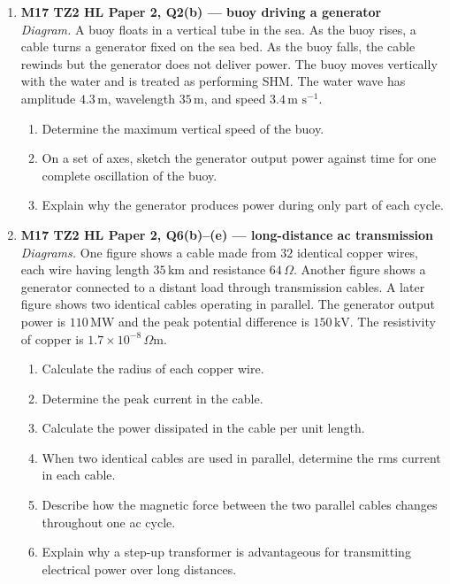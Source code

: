 \documentclass[11pt]{article}
\begin{document}
\begin{enumerate}[leftmargin=*, itemsep=1.1em]

\item \textbf{M17 TZ2 HL Paper 2, Q2(b) --- buoy driving a generator}\\
\textit{Diagram.} A buoy floats in a vertical tube in the sea. As the buoy rises, a cable turns a generator fixed on the sea bed. As the buoy falls, the cable rewinds but the generator does not deliver power. The buoy moves vertically with the water and is treated as performing SHM. The water wave has amplitude $4.3\,\text{m}$, wavelength $35\,\text{m}$, and speed $3.4\,\text{m s}^{-1}$.
\begin{enumerate}[label=(\alph*)]
\item Determine the maximum vertical speed of the buoy.
\item On a set of axes, sketch the generator output power against time for one complete oscillation of the buoy.
\item Explain why the generator produces power during only part of each cycle.
\end{enumerate}

\item \textbf{M17 TZ2 HL Paper 2, Q6(b)--(e) --- long-distance ac transmission}\\
\textit{Diagrams.} One figure shows a cable made from $32$ identical copper wires, each wire having length $35\,\text{km}$ and resistance $64\,\Omega$. Another figure shows a generator connected to a distant load through transmission cables. A later figure shows two identical cables operating in parallel. The generator output power is $110\,\text{MW}$ and the peak potential difference is $150\,\text{kV}$. The resistivity of copper is $1.7\times10^{-8}\,\Omega\text{m}$.
\begin{enumerate}[label=(\alph*)]
\item Calculate the radius of each copper wire.
\item Determine the peak current in the cable.
\item Calculate the power dissipated in the cable per unit length.
\item When two identical cables are used in parallel, determine the rms current in each cable.
\item Describe how the magnetic force between the two parallel cables changes throughout one ac cycle.
\item Explain why a step-up transformer is advantageous for transmitting electrical power over long distances.
\end{enumerate}


\end{enumerate}
\end{document}
